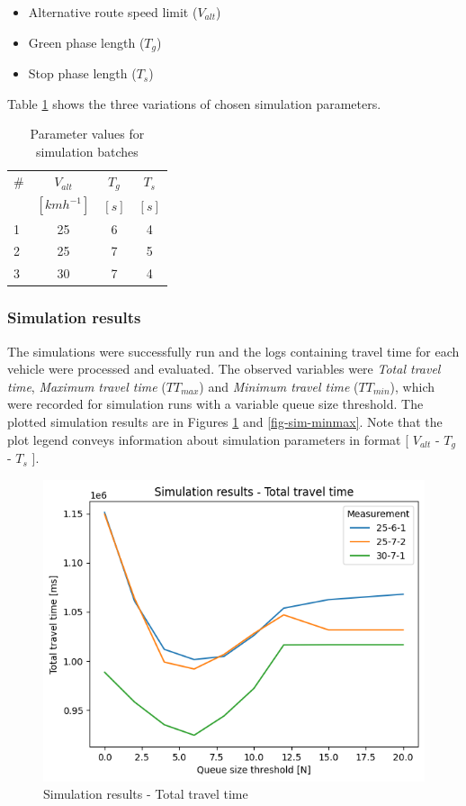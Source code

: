 \documentclass[0main.tex]{subfiles}
\begin{document}
\begin{itemize}
    \item Alternative route speed limit ($V_{alt}$)
    \item Green phase length ($T_{g}$)
    \item Stop phase length ($T_{s}$)
\end{itemize}

Table \ref{tab-sims} shows the three variations of chosen simulation parameters.

\begin{table}[htbp]
    \caption{Parameter values for simulation batches}
    \centering\begin{tabular}{lccc}
        \toprule
        \# & $V_{alt}$ & $T_{g}$ & $T_{s}$ \\ 
         & $[kmh^{-1}]$ & $[s]$ & $[s]$ \\ \midrule
        1 & 25  & 6 & 4 \\
        2 & 25  & 7 & 5 \\
        3 & 30  & 7 & 4 \\ \bottomrule
    \end{tabular}
    \label{tab-sims}
\end{table}

\subsubsection{Simulation results}

The simulations were successfully run and the logs containing travel time for each vehicle were
processed and evaluated. The observed variables were \emph{Total travel time}, \emph{Maximum
travel time} ($TT_{max}$) and \emph{Minimum travel time} ($TT_{min}$), which were recorded for
simulation runs with a variable queue size threshold. The plotted simulation results are in
Figures \ref{fig-sim-ttt} and \ref{fig-sim-minmax}. Note that the plot legend conveys
information about simulation parameters in format [ $V_{alt}$ - $T_{g}$ - $T_{s}$ ].

\begin{figure}[htbp]
    \centering
    \includegraphics[width=.8\textwidth]{ttt.png}
    \caption{Simulation results - Total travel time}
    \label{fig-sim-ttt}
\end{figure}
\end{document}
